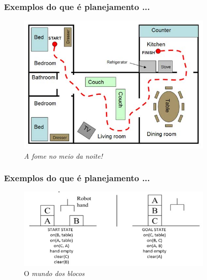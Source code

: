 \begin{frame}[fragile]
\frametitle{Exemplos do que é planejamento ...}

\begin{figure}[!htb]
\centering
\includegraphics[width=0.85\textwidth, height=0.70\textheight]{figures/planning01.jpg}
\caption{\textit{A fome no meio da noite!}}
\end{figure}


\end{frame}


\begin{frame}[fragile]
\frametitle{Exemplos do que é planejamento ...}

\begin{figure}[!htb]
\centering
\includegraphics[width=0.850\textwidth, height=0.650\textheight]{figures/mundo_dos_blocos01.jpg}
\caption{O \textit{mundo dos blocos}}
\end{figure}


\end{frame}


